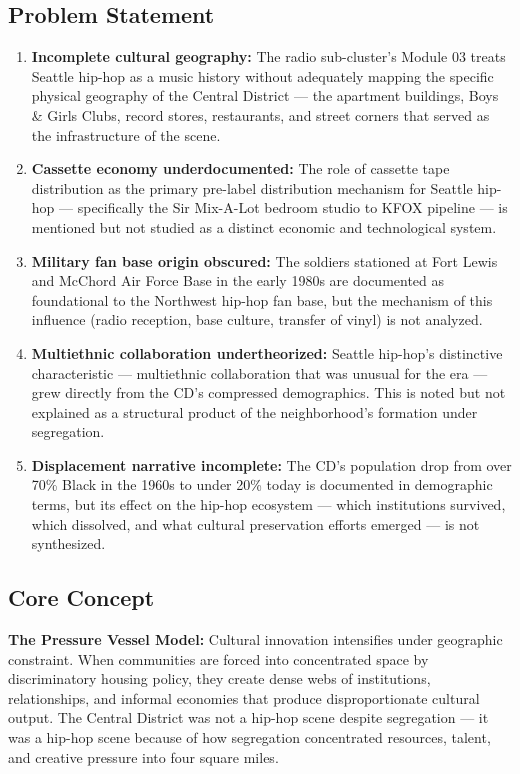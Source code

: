 \documentclass[11pt,letterpaper]{article}
\begin{document}
\subsection{Problem Statement}

\begin{enumerate}
  \item \textbf{Incomplete cultural geography:} The radio sub-cluster's Module 03 treats Seattle hip-hop as a music history without adequately mapping the specific physical geography of the Central District --- the apartment buildings, Boys \& Girls Clubs, record stores, restaurants, and street corners that served as the infrastructure of the scene.

  \item \textbf{Cassette economy underdocumented:} The role of cassette tape distribution as the primary pre-label distribution mechanism for Seattle hip-hop --- specifically the Sir Mix-A-Lot bedroom studio to KFOX pipeline --- is mentioned but not studied as a distinct economic and technological system.

  \item \textbf{Military fan base origin obscured:} The soldiers stationed at Fort Lewis and McChord Air Force Base in the early 1980s are documented as foundational to the Northwest hip-hop fan base, but the mechanism of this influence (radio reception, base culture, transfer of vinyl) is not analyzed.

  \item \textbf{Multiethnic collaboration undertheorized:} Seattle hip-hop's distinctive characteristic --- multiethnic collaboration that was unusual for the era --- grew directly from the CD's compressed demographics. This is noted but not explained as a structural product of the neighborhood's formation under segregation.

  \item \textbf{Displacement narrative incomplete:} The CD's population drop from over 70\% Black in the 1960s to under 20\% today is documented in demographic terms, but its effect on the hip-hop ecosystem --- which institutions survived, which dissolved, and what cultural preservation efforts emerged --- is not synthesized.
\end{enumerate}

\subsection{Core Concept}

\textbf{The Pressure Vessel Model:} Cultural innovation intensifies under geographic constraint. When communities are forced into concentrated space by discriminatory housing policy, they create dense webs of institutions, relationships, and informal economies that produce disproportionate cultural output. The Central District was not a hip-hop scene despite segregation --- it was a hip-hop scene because of how segregation concentrated resources, talent, and creative pressure into four square miles.
\end{document}
